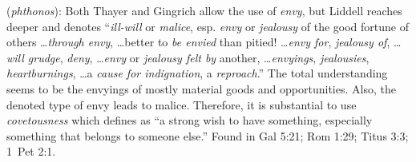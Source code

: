 \item[Covetousness,]

(\textit{phthonos}):
Both Thayer and Gingrich allow the use of \emph{envy}, but Liddell reaches deeper and denotes ``\emph{ill-will} or \emph{malice}, esp. \emph{envy} or \emph{jealousy} of the good fortune of others \ldots \emph{through envy}, \ldots better to \emph{be envied} than pitied! \ldots \emph{envy for}, \emph{jealousy of}, \ldots \emph{will grudge}, \emph{deny}, \ldots \emph{envy} or \emph{jealousy felt by} another, \ldots \emph{envyings}, \emph{jealousies}, \emph{heartburnings}, \ldots a \emph{cause for indignation}, a \emph{reproach}.'' The total understanding seems to be the envyings of mostly material goods and opportunities. Also, the denoted type of envy leads to malice. Therefore, it is substantial to use \emph{covetousness} which defines as ``a strong wish to have something, especially something that belongs to someone else.''
Found in Gal 5:21; Rom 1:29; Titus 3:3; 1~Pet 2:1.
